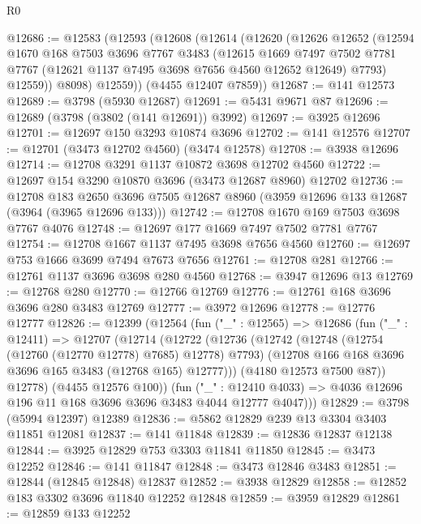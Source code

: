 \begin{lexlean}{R0}
\begin{coremodule}
@12686 := @12583
    (@12593
      (@12608
        (@12614
          (@12620
            (@12626
              @12652
              (@12594
                @1670
                @168
                @7503
                @3696
                @7767
                @3483
                (@12615
                  @1669
                  @7497
                  @7502
                  @7781
                  @7767
                  (@12621 @1137 @7495 @3698 @7656 @4560 @12652 @12649)
                  @7793)
                @12559))
            @8098)
          @12559))
      (@4455 @12407 @7859))
@12687 := @141 @12573
@12689 := @3798 (@5930 @12687)
@12691 := @5431 @9671 @87
@12696 := @12689 (@3798 (@3802 (@141 @12691)) @3992)
@12697 := @3925 @12696
@12701 := @12697 @150 @3293 @10874 @3696
@12702 := @141 @12576
@12707 := @12701 (@3473 @12702 @4560) (@3474 @12578)
@12708 := @3938 @12696
@12714 := @12708 @3291 @1137 @10872 @3698 @12702 @4560
@12722 := @12697 @154 @3290 @10870 @3696 (@3473 @12687 @8960) @12702
@12736 := @12708
    @183
    @2650
    @3696
    @7505
    @12687
    @8960
    (@3959 @12696 @133 @12687 (@3964 (@3965 @12696 @133)))
@12742 := @12708 @1670 @169 @7503 @3698 @7767 @4076
@12748 := @12697 @177 @1669 @7497 @7502 @7781 @7767
@12754 := @12708 @1667 @1137 @7495 @3698 @7656 @4560
@12760 := @12697 @753 @1666 @3699 @7494 @7673 @7656
@12761 := @12708 @281
@12766 := @12761 @1137 @3696 @3698 @280 @4560
@12768 := @3947 @12696 @13
@12769 := @12768 @280
@12770 := @12766 @12769
@12776 := @12761 @168 @3696 @3696 @280 @3483 @12769
@12777 := @3972 @12696
@12778 := @12776 @12777
@12826 := @12399
    (@12564
      (fun ("_" : @12565) =>
      @12686
        (fun ("_" : @12411) =>
        @12707
          (@12714
            (@12722
              (@12736
                (@12742
                  (@12748 (@12754 (@12760 (@12770 @12778) @7685) @12778) @7793)
                  (@12708 @166 @168 @3696 @3696 @165 @3483 (@12768 @165) @12777)))
              (@4180 @12573 @7500 @87))
            @12778)
          (@4455 @12576 @100))
        (fun ("_" : @12410 @4033) =>
        @4036 @12696 @196 @11 @168 @3696 @3696 @3483 @4044 @12777 @4047)))
@12829 := @3798 (@5994 @12397) @12389
@12836 := @5862 @12829 @239 @13 @3304 @3403 @11851 @12081
@12837 := @141 @11848
@12839 := @12836 @12837 @12138
@12844 := @3925 @12829 @753 @3303 @11841 @11850
@12845 := @3473 @12252
@12846 := @141 @11847
@12848 := @3473 @12846 @3483
@12851 := @12844 (@12845 @12848) @12837
@12852 := @3938 @12829
@12858 := @12852 @183 @3302 @3696 @11840 @12252 @12848
@12859 := @3959 @12829
@12861 := @12859 @133 @12252

\end{coremodule}
\end{lexlean}
